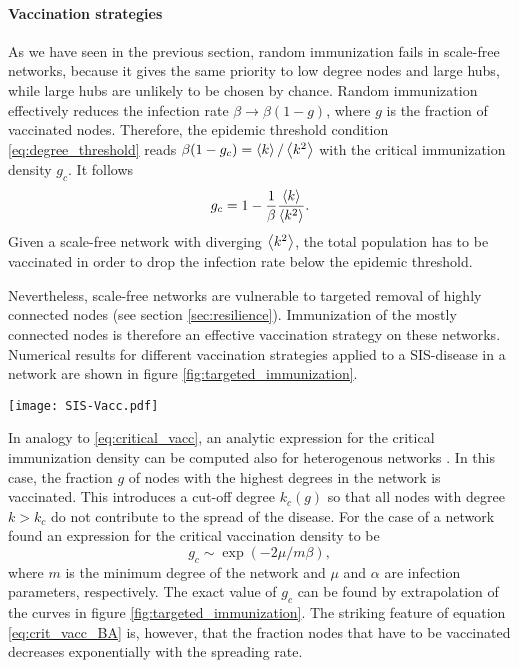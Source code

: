 \paragraph{Vaccination strategies\color{Cayenne}{.}}
As we have seen in the previous section, random immunization fails in scale-free networks, because it gives the same priority to low degree nodes and large hubs, while large hubs are unlikely to be chosen by chance.
Random immunization effectively reduces the infection rate $\beta \rightarrow \beta (1-g)$, where $g$ is the fraction of vaccinated nodes.
Therefore, the epidemic threshold condition \eqref{eq:degree_threshold} reads $\beta (1-g_c)=\left< k \right>/\left< k^2 \right>$ with the critical immunization density $g_c$.
It follows
\begin{equation}\label{eq:critical_vacc}
g_c=1- \frac{1}{\beta } \frac{\left< k \right>}{\left< k^2 \right>}.
\end{equation}
Given a scale-free network with diverging $\left< k^2 \right>$, the total population has to be vaccinated in order to drop the infection rate below the epidemic threshold.

Nevertheless, scale-free networks are vulnerable to targeted removal of highly connected nodes (see section \ref{sec:resilience}).
Immunization of the mostly connected nodes is therefore an effective vaccination strategy on these networks.
Numerical results for different vaccination strategies applied to a SIS-disease in a \BA network are shown in figure \ref{fig:targeted_immunization}.
%
\begin{SCfigure}
\texttt{[image: SIS-Vacc.pdf]}
\caption{Targeted and random vaccination for an SIS disease in a \BA network with $10^5$ nodes and $m=4$.
Infection parameters $\beta / \mu =2$.}
\label{fig:targeted_immunization}
\end{SCfigure}
%

In analogy to \eqref{eq:critical_vacc}, an analytic expression for the critical immunization density can be computed also for heterogenous networks \citep{PastorSat:immunization}.
In this case, the fraction $g$ of nodes with the highest degrees in the network is vaccinated.
This introduces a cut-off degree $k_c(g)$ so that all nodes with degree $k>k_c$ do not contribute to the spread of the disease.
For the case of a \BA network \citeauthor{PastorSat:immunization} found an expression for the critical vaccination density to be
\begin{equation}\label{eq:crit_vacc_BA}
g_c \sim \exp (-2\mu / m\beta ),
\end{equation}
where $m$ is the minimum degree of the network and $\mu $ and $\alpha $ are infection parameters, respectively.
The exact value of $g_c$ can be found by extrapolation of the curves in figure \ref{fig:targeted_immunization}.
The striking feature of equation \eqref{eq:crit_vacc_BA} is, however, that the fraction nodes that have to be vaccinated decreases exponentially with the spreading rate.


